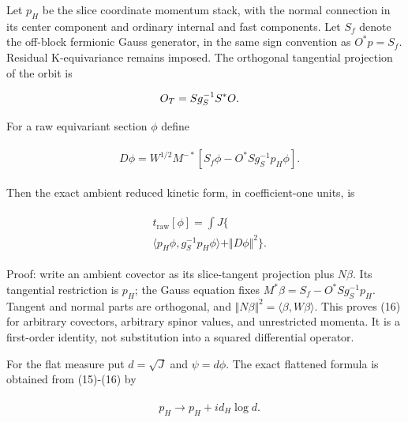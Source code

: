Let \(p_{H}\) be the slice coordinate momentum stack, with the normal
connection in its center component and ordinary internal and fast
components. Let \(S_{f}\) denote the off-block fermionic Gauss
generator, in the same sign convention as \(O^{*}p=S_{f}\). Residual
K-equivariance remains imposed. The orthogonal tangential projection of
the orbit is

\begin{gather*}
\begin{aligned}
& O_{T}=S g_{S}^{-1} S^{*}O.
\end{aligned}\notag
\end{gather*}

For a raw equivariant section \(\phi\) define

\begin{gather*}
\begin{aligned}
& D \phi =W^{1/2} M^{-*}[S_{f} \phi -O^{*}S g_{S}^{-1}p_{H} \phi ].
\end{aligned}\tag{15}
\end{gather*}

Then the exact ambient reduced kinetic form, in coefficient-one units,
is

\begin{gather*}
\begin{aligned}
& t_{\mathrm{raw}}[\phi ]=\int  J \{ \\
& \langle p_{H} \phi ,g_{S}^{-1}p_{H} \phi\rangle +\Vert D \phi \Vert ^{2} \}.
\end{aligned}\tag{16}
\end{gather*}

Proof: write an ambient covector as its slice-tangent projection plus
\(N \beta\). Its tangential restriction is \(p_{H}\); the Gauss equation
fixes \(M^{*} \beta =S_{f}-O^{*}S g_{S}^{-1}p_{H}\). Tangent and normal
parts are orthogonal, and
\(\Vert N \beta \Vert ^{2}=\langle \beta ,W \beta\rangle\). This proves
(16) for arbitrary covectors, arbitrary spinor values, and unrestricted
momenta. It is a first-order identity, not substitution into a squared
differential operator.

For the flat measure put \(d=\sqrt{J}\) and \(\psi =d \phi\). The exact
flattened formula is obtained from (15)-(16) by

\begin{gather*}
\begin{aligned}
& p_{H} \to  p_{H}+i d_{H} \log  d.
\end{aligned}\tag{17}
\end{gather*}

